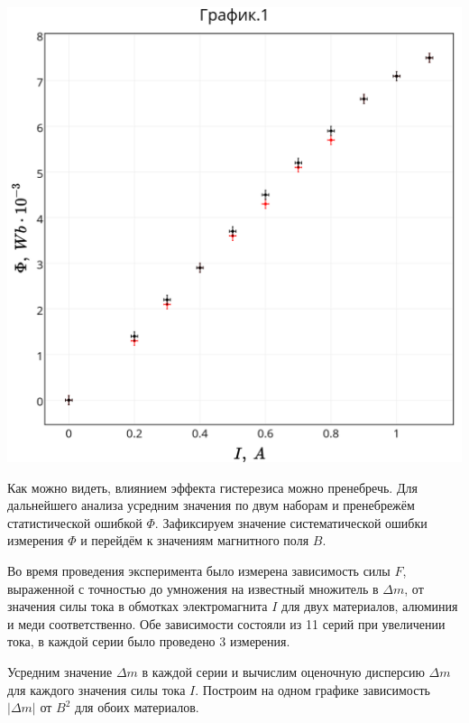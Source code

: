 \includegraphics[scale = 0.19]{my_plot1.png}

Как можно видеть, влиянием эффекта гистерезиса можно пренебречь. Для дальнейшего анализа усредним значения по двум наборам и пренебрежём статистической ошибкой $\Phi$. Зафиксируем значение систематической ошибки измерения $\Phi$ и перейдём к значениям магнитного поля $B$.

Во время проведения эксперимента было измерена зависимость силы $F$, выраженной с точностью до умножения на известный множитель в $\Delta{m}$, от значения силы тока в обмотках электромагнита $I$ для двух материалов, алюминия и меди соответственно. Обе зависимости состояли из 11 серий при увеличении тока, в каждой серии было проведено 3 измерения. 

Усредним значение $\Delta{m}$ в каждой серии и вычислим оценочную дисперсию $\Delta{m}$ для каждого значения силы тока $I$. Построим на одном графике зависимость $|\Delta{m}|$ от $B^2$ для обоих материалов.

